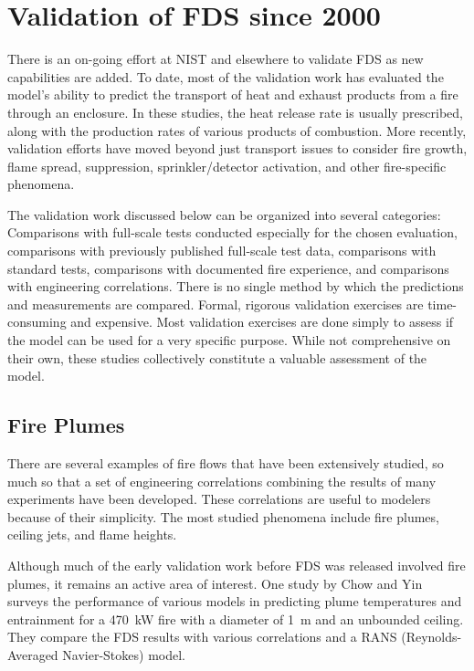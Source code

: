 \section{Validation of FDS since 2000}

There is an  on-going effort at NIST and elsewhere  to validate FDS as new capabilities are  added. To date, most of  the validation work has
evaluated the  model's ability  to predict the  transport of  heat and exhaust products from  a fire through an enclosure.  In these studies, the
heat release rate is usually prescribed, along with the production rates of  various products  of combustion.  More  recently, validation efforts
have moved  beyond  just transport  issues  to consider  fire growth, flame spread,  suppression, sprinkler/detector activation, and other
fire-specific phenomena.

The  validation work  discussed below  can be  organized  into several categories: Comparisons with full-scale tests conducted especially for the
chosen  evaluation,   comparisons   with  previously   published full-scale  test data,  comparisons with  standard  tests, comparisons with
documented  fire experience,  and  comparisons with  engineering correlations.  There is no single  method by which the predictions and measurements
are compared.   Formal, rigorous validation exercises are time-consuming  and  expensive.  Most  validation exercises  are  done simply to assess if
the model can be used for a very specific purpose. While  not  comprehensive on  their  own,  these studies  collectively constitute a valuable
assessment of the model.



\subsection{Fire Plumes}

There are  several examples of  fire flows that have  been extensively studied, so much  so that a set of  engineering correlations combining the
results  of   many  experiments   have  been   developed.  These correlations are  useful to modelers because of  their simplicity. The most studied
phenomena include fire  plumes, ceiling jets,  and flame heights.

Although much  of the  early validation work  before FDS  was released involved fire plumes, it remains an active area of interest. One study by
Chow  and Yin~\cite{Chow:1}  surveys  the  performance of  various models in predicting plume temperatures and entrainment for a 470~kW fire with a
diameter of  1~m and an  unbounded ceiling.  They compare the FDS results with various
correlations and a  RANS (Reynolds-Averaged Navier-Stokes) model.

